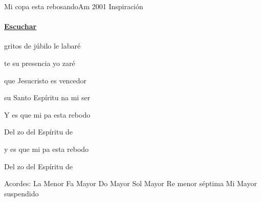 \documentclass[12pt, spanish]{book}
\begin{document}
    \begin{song}{Mi copa esta rebosando}{Am}
    {2001} %
    {Inspiración}
    {} %
    {}
        \ifChordBk
            \paragraph{\mbox{}\hfill\protect\href{https://open.spotify.com/intl-es/track/222ynRiO7GHL33bxnybMBB}{Escuchar}\mbox{}\hfill}
        \fi

        \begin{SBOpGroup}
             gritos de júbilo le labaré

            te su presencia yo zaré

            que Jesucristo es  vencedor

             su Santo Espíritu na mi ser
        \end{SBOpGroup}

        \begin{SBChorus}
            Y es que mi pa esta rebodo

            Del zo del Espíritu de 

            y es que mi pa esta rebodo

            Del zo del Espíritu de 
        \end{SBChorus}

        \ifChordBk
        \begin{SBOpGroup}
            Acordes:\break
            \upchord{\Am}\qquad La Menor \hfill
            \upchord{\F}\qquad Fa Mayor \hfill\null\break
            \upchord{\C}\qquad Do Mayor \hfill
            \upchord{\G}\qquad Sol Mayor \hfill\null\break
            \upchord{\Dmseven}\qquad Re menor s\'eptima \hfill
            \upchord{\Esus}\qquad Mi Mayor suspendido \hfill\null\break
        \end{SBOpGroup}
        \fi
    \end{song}
\end{document}

